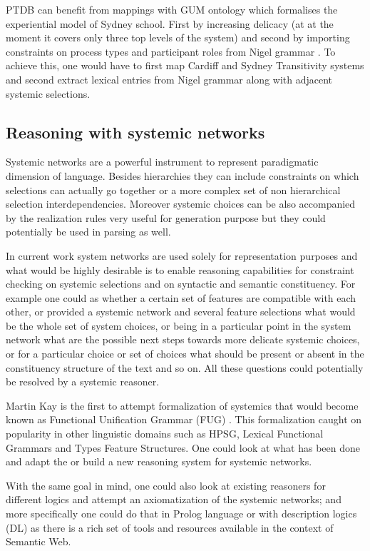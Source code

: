 PTDB can benefit from mappings with GUM ontology which formalises the experiential model of Sydney school. First by increasing delicacy (at at the moment it covers only three top levels of the system) and second by importing constraints on process types and participant roles from Nigel grammar \citep{Matthiessen1985}. To achieve this, one would have to first map Cardiff and Sydney Transitivity systems and second extract lexical entries from Nigel grammar along with adjacent systemic selections. 

\subsection{Reasoning with systemic networks}
Systemic networks are a powerful instrument to represent paradigmatic dimension of language. Besides hierarchies they can include constraints on which selections can actually go together or a more complex set of non hierarchical selection interdependencies. Moreover systemic choices can be also accompanied by the realization rules very useful for generation purpose but they could potentially be used in parsing as well. 

In current work system networks are used solely for representation purposes and what would be highly desirable is to enable reasoning capabilities for constraint checking on systemic selections and on syntactic and semantic constituency. For example one could as whether a certain set of features are compatible with each other, or provided a systemic network and several feature selections what would be the whole set of system choices, or being in a particular point in the system network what are the possible next steps towards more delicate systemic choices, or for a particular choice or set of choices what should be present or absent in the constituency structure of the text and so on. All these questions could potentially be resolved by a systemic reasoner. 

Martin Kay is the first to attempt formalization of systemics that would become known as Functional Unification Grammar (FUG) \citep{Kay1985}. This formalization caught on popularity in other linguistic domains such as HPSG, Lexical Functional Grammars and Types Feature Structures. One could look at what has been done and adapt the or build a new reasoning system for systemic networks. 

With the same goal in mind, one could also look at existing reasoners for different logics and attempt an axiomatization of the systemic networks; and more specifically one could do that in Prolog language or with description logics (DL) as there is a rich set of tools and resources available in the context of Semantic Web.

